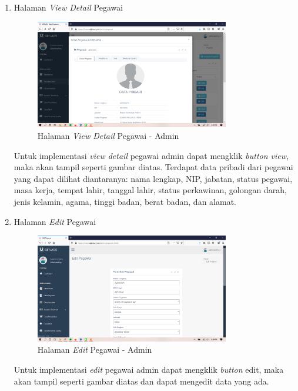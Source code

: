 \begin{enumerate}
	\item Halaman \textit{View Detail} Pegawai
	\begin{figure}
		\centering
		\includegraphics[width=0.8\textwidth]
		{pics/admin/implementasi/viewdetailpegawai.png}
		\caption{Halaman \textit{View Detail} Pegawai - Admin}
		\label{fig:CC10}
	\end{figure}
	Untuk implementasi \textit{view detail} pegawai admin dapat mengklik \textit{button view}, maka akan tampil seperti gambar diatas. Terdapat data pribadi dari pegawai yang dapat dilihat diantaranya: nama lengkap, NIP, jabatan, status pegawai, masa kerja, tempat lahir, tanggal lahir, status perkawinan, golongan darah, jenis kelamin, agama, tinggi badan, berat badan, dan alamat.
	
	\item Halaman \textit{Edit} Pegawai
	\begin{figure}
		\centering
		\includegraphics[width=0.8\textwidth]
		{pics/admin/implementasi/editpegawai.png}
		\caption{Halaman \textit{Edit} Pegawai - Admin}
		\label{fig:CC10}
	\end{figure}
	Untuk implementasi \textit{edit} pegawai admin dapat mengklik \textit{button} edit, maka akan tampil seperti gambar diatas dan dapat mengedit data yang ada.
	

\end{enumerate}
